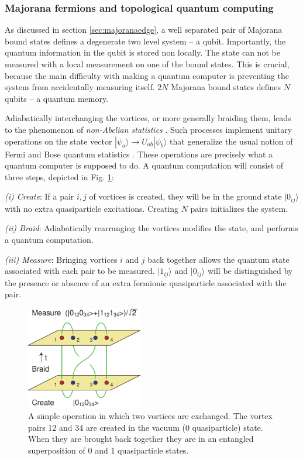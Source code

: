\documentclass[twocolumn,floatfix,showpacs,rmp,aps]{revtex4}
\begin{document}
	\subsubsection{Majorana fermions and topological quantum computing}
	\label{sec:qcompute}
	
	As discussed in section \ref{sec:majoranaedge}, a well separated pair of
	Majorana bound states
	defines a degenerate two level system -- a qubit.  Importantly, the quantum
	information in the qubit is stored non locally.  The state
	can not be measured with a local measurement on one of the bound states.  This
	is crucial, because the main difficulty with making a quantum computer is
	preventing the system from accidentally measuring itself.  $2N$ Majorana bound states
	defines $N$ qubits -- a quantum memory.
	
	Adiabatically interchanging the vortices, or more generally braiding them, leads to
	the phenomenon of {\it non-Abelian statistics} \cite{mooreread91}.  Such processes implement unitary
	operations on the state vector $|\psi_a\rangle\rightarrow
	U_{ab}|\psi_b\rangle$ that generalize the usual notion of Fermi and Bose quantum
	statistics \cite{nayak96,ivanov01}.  These operations are precisely
	what a quantum computer is supposed to do.
	A quantum computation will consist of three steps, depicted in Fig. \ref{fig:braid}:
	
	{\it (i) Create}:  If a pair $i, j$ of
	vortices is created, they will be in the ground state $|0_{ij}\rangle$
	with no extra quasiparticle excitations.  Creating $N$ pairs
	initializes the system.
	
	{\it (ii) Braid}:  Adiabatically rearranging
	the vortices modifies the state, and performs a quantum computation.
	
	{\it (iii) Measure}: Bringing vortices $i$ and $j$ back together allows
	the quantum state associated with each pair to be measured.
	$|1_{ij}\rangle$ and $|0_{ij}\rangle$ will be distinguished by the presence or
	absence of an extra fermionic quasiparticle associated with the pair.
	
	\begin{figure}
		\includegraphics[width=2in]{Fig19}
		\caption{A simple operation in which two vortices are exchanged.  The vortex pairs 12 and 34 are
			created in the vacuum (0 quasiparticle) state.
			When they are brought back together they are in an entangled superposition of
			0 and 1 quasiparticle states.}
		\label{fig:braid}
	\end{figure}
	
\end{document}
